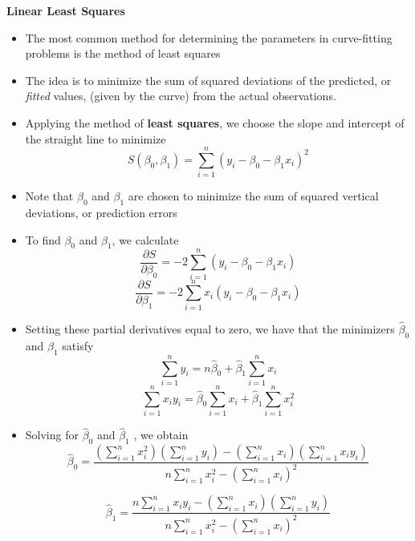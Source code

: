 \documentclass[landscape]{slides}
\newcommand{\heading}[1]{%
  \begin{center}
    \large\bf \color{red}
        #1
  \end{center}
  \vspace{1ex minus 1ex}}
\begin{document}
\begin{slide}
\heading{Linear Least Squares}
\begin{itemize}
\item The most common method for determining the parameters in curve-fitting
problems is the method of least squares

\item The idea is to minimize the sum of squared deviations of the predicted,
or {\it fitted} values, (given by the curve) from the actual observations.

\item Applying the method of {\bf least squares}, we choose the slope and
intercept of the straight line to minimize
$$S(\beta_0,\beta_1)=\sum_{i=1}^n (y_i-\beta_0-\beta_1x_i)^2$$
%
\item Note that $\beta_0$ and $\beta_1$ are chosen to minimize the sum of squared
vertical deviations, or prediction errors

\item To find $\beta_0$ and $\beta_1$, we calculate
$$\frac{\partial S}{\partial\beta_0}=-2\sum_{i=1}^n(y_i-\beta_0-\beta_1x_i)$$
$$\frac{\partial S}{\partial\beta_1}=-2\sum_{i=1}^nx_i(y_i-\beta_0-\beta_1x_i)$$

\item Setting these partial derivatives equal to zero, we have that the minimizers
$\hat{\beta}_0$ and $\hat{\beta}_1$ satisfy
$$\sum_{i=1}^ny_i=n\hat{\beta}_0+\hat{\beta}_1\sum_{i=1}^nx_i$$
$$\sum_{i=1}^nx_iy_i=\hat{\beta}_0\sum_{i=1}^nx_i+\hat{\beta}_1\sum_{i=1}^nx_i^2$$

\item Solving for $\hat{\beta}_0$ and $\hat{\beta}_1$ , we obtain
$$\hat{\beta}_0=\frac{(\sum_{i=1}^nx_i^2)(\sum_{i=1}^ny_i)-(\sum_{i=1}^nx_i)(\sum_{i=1}^nx_iy_i)}{n\sum_{i=1}^nx_i^2-(\sum_{i=1}^nx_i)^2}$$

$$\hat{\beta}_1=\frac{n\sum_{i=1}^nx_iy_i-(\sum_{i=1}^nx_i)(\sum_{i=1}^ny_i)}{n\sum_{i=1}^nx_i^2-(\sum_{i=1}^nx_i)^2}$$

\end{itemize}
\end{slide}
\end{document}
